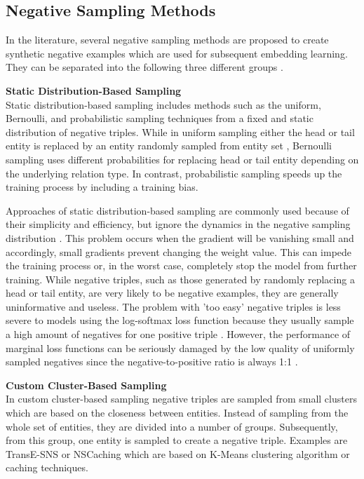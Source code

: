 \subsection{Negative Sampling Methods} 
\label{subsec:negative_sampling_methods}
%
In the literature, several negative sampling methods are proposed to create synthetic negative examples which are used for subsequent embedding learning.
They can be separated into the following three different groups \cite{qianunderstanding}.

\textbf{Static Distribution-Based Sampling} \label{static_distribution_based_sampling}\\
Static distribution-based sampling includes methods such as the uniform, Bernoulli, and probabilistic sampling techniques from a fixed and static distribution of negative triples.
While in uniform sampling either the head or tail entity is replaced by an entity randomly sampled from entity set \entities,
Bernoulli sampling uses different probabilities for replacing head or tail entity depending on the underlying relation type.
In contrast, probabilistic sampling speeds up the training process by including a training bias.
	
Approaches of static distribution-based sampling are commonly used because of their simplicity and efficiency, but ignore the dynamics in the negative sampling distribution \cite{qianunderstanding}.
This problem occurs when the gradient will be vanishing small and accordingly, small gradients prevent changing the weight value.
This can impede the training process or, in the worst case, completely stop the model from further training.
While negative triples, such as those generated by randomly replacing a head or tail entity, are very likely to be negative examples, they are generally uninformative and useless.
The problem with 'too easy' negative triples is less severe to models using the log-softmax loss function because they usually sample a high amount of negatives for one positive triple \cite{cai2017kbgan}.
However, the performance of marginal loss functions can be seriously damaged by the low quality of uniformly sampled negatives since the negative-to-positive ratio is always 1:1 \cite{cai2017kbgan}.


\textbf{Custom Cluster-Based Sampling} \label{subsubsec:custom_cluster_based_sampling}\\
In custom cluster-based sampling negative triples are sampled from small clusters which are based on the closeness between entities.
Instead of sampling from the whole set of entities, they are divided into a number of groups.
Subsequently, from this group, one entity is sampled to create a negative triple. 
Examples are TransE-\ac{SNS} \cite{TransE-SNS} or \ac{NSCaching} \cite{zhang2019nscaching} which are based on K-Means clustering algorithm or caching techniques. 

